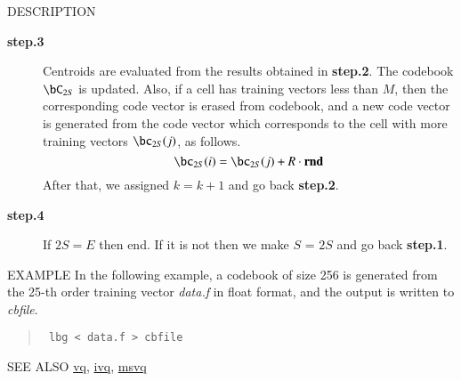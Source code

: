 \begin{qsection}{DESCRIPTION}
\begin{description}
\item[\bf step.3~~~]
Centroids are evaluated from the results obtained in {\bf step.2}.
The codebook $\bC_{2S}$ is updated.
Also, if a cell has training vectors less than $M$, then the corresponding
code vector is erased from codebook,
and a new code vector is generated from the code vector
which corresponds to the cell with more training vectors 
$\bc_{2S}(j)$, as follows.
\begin{displaymath}
\bc_{2S}(i)=\bc_{2S}(j) + R \cdot \bm{\mathrm{rnd}}
\end{displaymath}
After that, we assigned $k=k+1$ and go back {\bf step.2}.

\item[\bf step.4~~~]
If $2S = E$ then end.
If it is not then we make $S$ = $2S$ and go back {\bf step.1}.

\end{description}
\end{qsection}

\begin{options}
\end{options}

\begin{qsection}{EXAMPLE}
In the following example, a codebook of size 256 is generated from
the 25-th order training vector {\em data.f} in float format,
and the output is written to {\em cbfile}.
\begin{quote}
\verb! lbg < data.f > cbfile!
\end{quote}
\end{qsection}

\begin{qsection}{SEE ALSO}
\hyperlink{vq}{vq},
\hyperlink{ivq}{ivq},
\hyperlink{msvq}{msvq}
\end{qsection}
